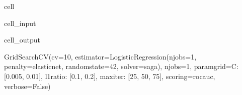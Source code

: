 \documentclass[letterpaper,10pt,english]{jupyterBook}
\begin{document}
\begin{sphinxuseclass}{cell}
\begin{sphinxVerbatimInput}
\begin{sphinxuseclass}{cell_input}
\end{sphinxuseclass}\end{sphinxVerbatimInput}
\begin{sphinxVerbatimOutput}

\begin{sphinxuseclass}{cell_output}
\begin{sphinxVerbatim}[commandchars=\\\{\}]
GridSearchCV(cv=10,
             estimator=LogisticRegression(n\PYGZus{}jobs=\PYGZhy{}1, penalty=\PYGZsq{}elasticnet\PYGZsq{},
                                          random\PYGZus{}state=42, solver=\PYGZsq{}saga\PYGZsq{}),
             n\PYGZus{}jobs=\PYGZhy{}1,
             param\PYGZus{}grid=\PYGZob{}\PYGZsq{}C\PYGZsq{}: [0.005, 0.01], \PYGZsq{}l1\PYGZus{}ratio\PYGZsq{}: [0.1, 0.2],
                         \PYGZsq{}max\PYGZus{}iter\PYGZsq{}: [25, 50, 75]\PYGZcb{},
             scoring=\PYGZsq{}roc\PYGZus{}auc\PYGZsq{}, verbose=False)
\end{sphinxVerbatim}

\end{sphinxuseclass}\end{sphinxVerbatimOutput}

\end{sphinxuseclass}
\end{document}
